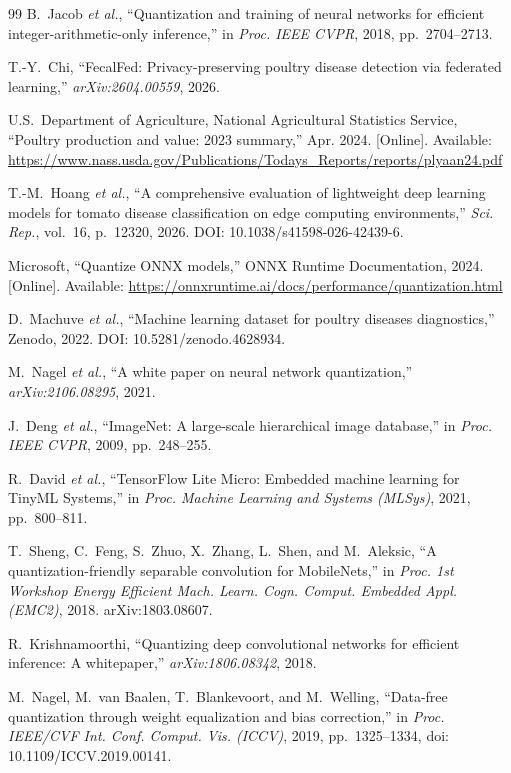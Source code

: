 \documentclass[conference,a4paper]{IEEEtran}
\begin{document}
\begin{thebibliography}{99}
B.~Jacob \textit{et al.}, ``Quantization and training of neural networks for efficient integer-arithmetic-only inference,'' in \emph{Proc. IEEE CVPR}, 2018, pp.~2704--2713.

T.-Y.~Chi, ``FecalFed: Privacy-preserving poultry disease detection via federated learning,'' \textit{arXiv:2604.00559}, 2026.

U.S.~Department of Agriculture, National Agricultural Statistics Service, ``Poultry production and value: 2023 summary,'' Apr. 2024. [Online]. Available: \url{https://www.nass.usda.gov/Publications/Todays_Reports/reports/plyaan24.pdf}

T.-M.~Hoang \textit{et al.}, ``A comprehensive evaluation of lightweight deep learning models for tomato disease classification on edge computing environments,'' \emph{Sci. Rep.}, vol.~16, p.~12320, 2026. DOI: 10.1038/s41598-026-42439-6.

Microsoft, ``Quantize ONNX models,'' ONNX Runtime Documentation, 2024. [Online]. Available: \url{https://onnxruntime.ai/docs/performance/quantization.html}

D.~Machuve \textit{et al.}, ``Machine learning dataset for poultry diseases diagnostics,'' Zenodo, 2022. DOI: 10.5281/zenodo.4628934.

M.~Nagel \textit{et al.}, ``A white paper on neural network quantization,'' \textit{arXiv:2106.08295}, 2021.

J.~Deng \textit{et al.}, ``ImageNet: A large-scale hierarchical image database,'' in \emph{Proc. IEEE CVPR}, 2009, pp.~248--255.

R.~David \textit{et al.}, ``TensorFlow Lite Micro: Embedded machine learning for TinyML Systems,'' in \textit{Proc. Machine Learning and Systems (MLSys)}, 2021, pp.~800--811.

T.~Sheng, C.~Feng, S.~Zhuo, X.~Zhang, L.~Shen, and M.~Aleksic, ``A quantization-friendly separable convolution for {MobileNets},'' in \emph{Proc. 1st Workshop Energy Efficient Mach. Learn. Cogn. Comput. Embedded Appl. (EMC2)}, 2018. arXiv:1803.08607.

R.~Krishnamoorthi, ``Quantizing deep convolutional networks for efficient inference: A whitepaper,'' \textit{arXiv:1806.08342}, 2018.

M.~Nagel, M.~van Baalen, T.~Blankevoort, and M.~Welling, ``Data-free quantization through weight equalization and bias correction,'' in \emph{Proc. IEEE/CVF Int. Conf. Comput. Vis. (ICCV)}, 2019, pp.~1325--1334, doi: 10.1109/ICCV.2019.00141.

\end{thebibliography}
\end{document}
